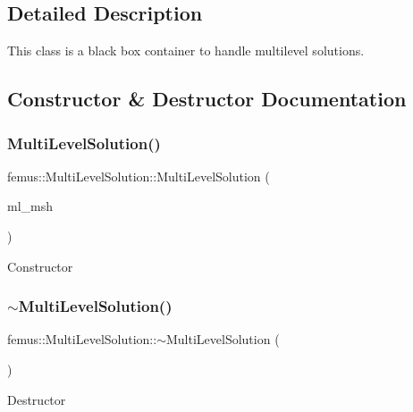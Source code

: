 \subsection{Detailed Description}
This class is a black box container to handle multilevel solutions. 

\subsection{Constructor \& Destructor Documentation}
\mbox{\label{classfemus_1_1_multi_level_solution_a1eb7aedad8ef351fdce884425b7a6928}} 
\subsubsection{\texorpdfstring{Multi\+Level\+Solution()}{MultiLevelSolution()}}
{\footnotesize\ttfamily femus\+::\+Multi\+Level\+Solution\+::\+Multi\+Level\+Solution (\begin{DoxyParamCaption}\item[{\mbox{\hyperlink{classfemus_1_1_multi_level_mesh}{Multi\+Level\+Mesh}} $\ast$}]{ml\+\_\+msh }\end{DoxyParamCaption})}

Constructor \mbox{\label{classfemus_1_1_multi_level_solution_a3be34a688b8951bfaa32dc70dd227750}} 
\subsubsection{\texorpdfstring{$\sim$\+Multi\+Level\+Solution()}{~MultiLevelSolution()}}
{\footnotesize\ttfamily femus\+::\+Multi\+Level\+Solution\+::$\sim$\+Multi\+Level\+Solution (\begin{DoxyParamCaption}{ }\end{DoxyParamCaption})}

Destructor 

